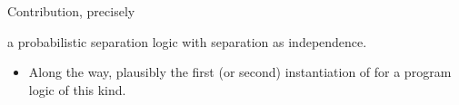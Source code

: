 
\begin{frame}{Contribution, precisely}
  \vfill
  \begin{center}
    {\Large{}}

    \vspace{0.6em}

    {\normalsize a  probabilistic separation logic with
      \alert{separation as independence}.}
  \end{center}
  \vfill
  \begin{itemize}
    \item[] {\small Along the way, plausibly the first (or second) instantiation
          of  for a program logic of this kind.}
  \end{itemize}
  \vfill
\end{frame}


